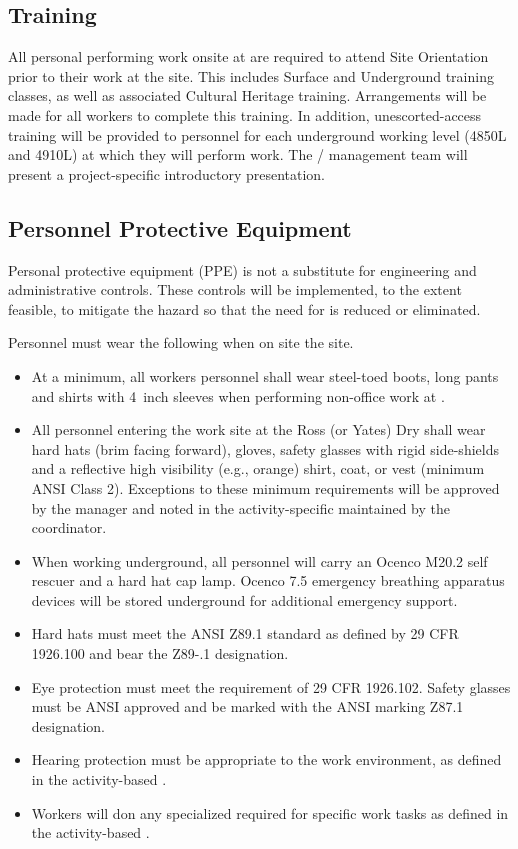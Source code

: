 \subsection{ Training}


All personal performing work onsite at  are required to
attend   Site Orientation prior to their work
at the site.  This includes  Surface and Underground
training classes, as well as associated Cultural Heritage
training. Arrangements will be made for all workers to complete this
training. In addition, unescorted-access training will be provided to
personnel for each underground working level (4850L and 4910L) at
which they will perform work.  The /
 management team will present a project-specific
introductory  presentation.

\subsection{Personnel Protective Equipment}

Personal protective equipment (PPE) is not a substitute for
engineering and administrative controls. These controls will be
implemented, to the extent feasible, to mitigate the hazard so that
the need for  is reduced or eliminated.

Personnel must wear the following  when on site the  site.
\begin{itemize}
\item At a minimum, all workers personnel shall wear
  steel-toed boots, long pants and shirts with 4~inch sleeves when
  performing non-office work at . 
  \item All personnel entering the work site at the Ross (or Yates) Dry
    shall wear hard hats (brim facing forward), gloves,
    safety glasses with rigid side-shields and a reflective high
    visibility (e.g., orange) shirt, coat, or vest (minimum ANSI Class 2).
    Exceptions to these minimum requirements will be approved by the
      manager and noted in the
    activity-specific  maintained by the   coordinator.
  \item When working underground, all personnel will carry an Ocenco M20.2 self rescuer
    and a hard hat cap lamp.  Ocenco 7.5 emergency breathing apparatus devices
    will be stored underground for additional emergency support.
  \item Hard hats must meet the ANSI Z89.1 standard as defined by 29
    CFR 1926.100 and bear the Z89-.1 designation. 
   \item Eye protection must meet the requirement of 29 CFR
      1926.102. Safety glasses must be ANSI approved and be marked
      with the ANSI marking Z87.1 designation.
    \item Hearing protection must be appropriate to the work environment, as
      defined in the activity-based .
    \item Workers will don any specialized  required for specific work tasks as
      defined in the activity-based . 
\end{itemize}

